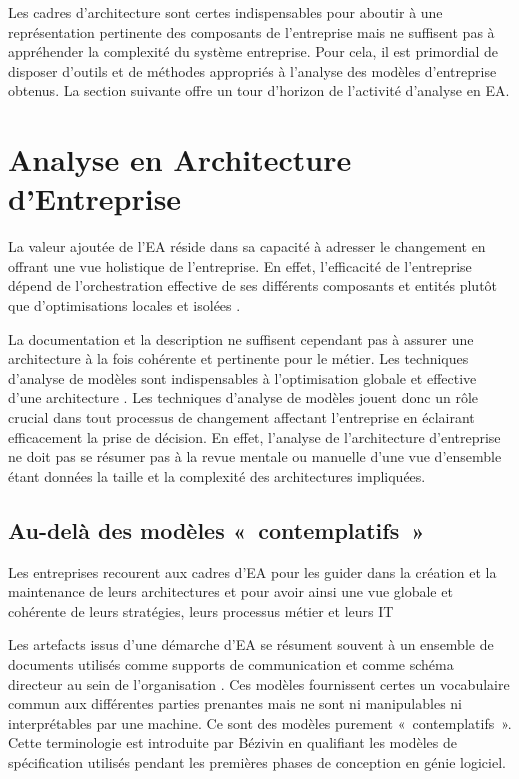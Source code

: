 Les cadres d'architecture sont certes indispensables pour aboutir à une représentation pertinente des composants de l'entreprise mais ne suffisent pas à appréhender la complexité du système entreprise. Pour cela, il est primordial de disposer d'outils et de méthodes appropriés à l'analyse des modèles d'entreprise obtenus. La section suivante offre un tour d'horizon de l'activité d'analyse en EA. 

\section{Analyse en Architecture d'Entreprise}
\label{sec:analyse_EA}

La valeur ajoutée de l'EA réside dans sa capacité à adresser le changement en
offrant une vue holistique de l'entreprise. En effet, l'efficacité de
l'entreprise dépend de l'orchestration effective de ses différents composants
et entités plutôt que d'optimisations locales et isolées
\cite{nadler1992organizational}. 

La documentation et la description ne suffisent cependant pas à assurer une
architecture à la fois cohérente et pertinente pour le métier. Les techniques
d'analyse de modèles sont indispensables à l'optimisation globale et effective
d'une architecture \cite{lankhorst2013enterprise}. Les techniques d'analyse de
modèles jouent donc un rôle crucial dans tout processus de changement affectant
l'entreprise en éclairant efficacement la prise de décision. En effet,
l'analyse de l'architecture d'entreprise ne doit pas se résumer pas à la revue
mentale ou manuelle d'une vue d'ensemble étant données la taille et la
complexité des architectures impliquées.

\subsection{Au-delà des modèles «~contemplatifs~»}
\label{sec:EA_contemplatif}
Les entreprises recourent aux cadres d'EA pour les guider dans la création et
la maintenance de leurs architectures et pour avoir ainsi une vue globale et
cohérente de leurs stratégies, leurs processus métier et leurs IT 

Les artefacts issus d'une démarche d'EA se résument souvent à un ensemble de
documents utilisés comme supports de communication et comme schéma directeur au
sein de l'organisation \cite{kulkarni_modelling_2013}
\cite{clark_towards_2014}.  Ces modèles fournissent certes un vocabulaire
commun aux différentes parties prenantes mais ne sont	 ni manipulables ni
interprétables par une machine. Ce sont des modèles purement «~contemplatifs~».
Cette terminologie est introduite par Bézivin \cite{bezivin_towards_2001} en qualifiant les modèles de spécification utilisés pendant les premières phases de conception en génie
logiciel. 

